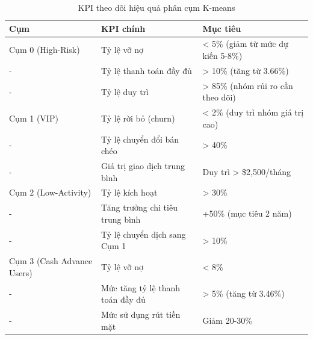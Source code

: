 \begin{table}[H]
\centering
\caption{KPI theo dõi hiệu quả phân cụm K-means}
\begin{tabular}{|p{3cm}|p{4.2cm}|p{6.2cm}|}
\hline
\textbf{Cụm} & \textbf{KPI chính} & \textbf{Mục tiêu} \\
\hline
Cụm 0 (High-Risk) & Tỷ lệ vỡ nợ & < 5\% (giảm từ mức dự kiến 5-8\%) \\
- & Tỷ lệ thanh toán đầy đủ & > 10\% (tăng từ 3.66\%) \\
- & Tỷ lệ duy trì & > 85\% (nhóm rủi ro cần theo dõi) \\
\hline
Cụm 1 (VIP) & Tỷ lệ rời bỏ (churn) & < 2\% (duy trì nhóm giá trị cao) \\
- & Tỷ lệ chuyển đổi bán chéo & > 40\% \\
- & Giá trị giao dịch trung bình & Duy trì > \$2,500/tháng \\
\hline
Cụm 2 (Low-Activity) & Tỷ lệ kích hoạt & > 30\% \\
- & Tăng trưởng chi tiêu trung bình & +50\% (mục tiêu 2 năm) \\
- & Tỷ lệ chuyển dịch sang Cụm 1 & > 10\% \\
\hline
Cụm 3 (Cash Advance Users) & Tỷ lệ vỡ nợ & < 8\% \\
- & Mức tăng tỷ lệ thanh toán đầy đủ & > 5\% (tăng từ 3.46\%) \\
- & Mức sử dụng rút tiền mặt & Giảm 20-30\% \\
\hline
\end{tabular}
\end{table}
